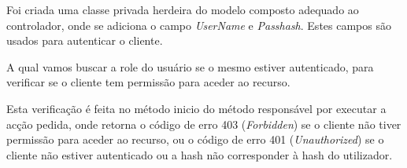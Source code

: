 Foi criada uma classe privada herdeira do modelo composto adequado ao controlador, onde se adiciona o campo \textit{UserName} e \textit{Passhash}. Estes campos são usados para autenticar o cliente.

A qual vamos buscar a role do usuário se o mesmo estiver autenticado, para verificar se o cliente tem permissão para aceder ao recurso.

Esta verificação é feita no método inicio do método responsável por executar a acção pedida, onde retorna o código de erro 403 (\textit{Forbidden}) se o cliente não tiver permissão para aceder ao recurso, ou o código de erro 401 (\textit{Unauthorized}) se o cliente não estiver autenticado ou a hash não corresponder à hash do utilizador.

